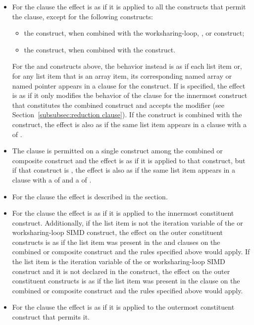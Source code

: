 \begin{itemize}
\item For the  clause the effect is as if it is applied to all the constructs that permit
the clause, except for the following constructs:
\begin{itemize}
\item the  construct, when combined with the
    worksharing-loop, , or  construct;
\item the  construct,  when combined with the  construct.
\end{itemize}
For the  and  constructs above, the behavior
instead is as if each list item or, for any list item that is an array item, its corresponding
named array or named pointer appears in a  clause for the construct.
If  is specified, the effect is as if it only modifies
the behavior of the  clause for the innermost construct that
constitutes the combined construct and accepts the modifier (see
Section~\ref{subsubsec:reduction clause}). If the construct is combined with
the  construct, the effect is also as if the same list item
appears in a  clause with a  of .

\item The  clause is permitted on a single construct
among the combined or composite construct and the effect is as if it is
applied to that construct, but if that construct is , the
effect is also as if the same list item appears in a  clause with
a  of  and a  of
.

\item For the  clause the effect is described in the  section.

\item For the  clause the effect is as if it is applied to the innermost
constituent construct.
Additionally, if the list item is not the iteration variable of the
 or worksharing-loop SIMD
construct, the effect on the outer constituent constructs is as if the list item was present
in the  and  clauses on the combined or
composite construct and the rules specified above would apply.  If the list item is the
iteration variable of the  or worksharing-loop SIMD construct and it is not declared in the construct,
the effect on the outer constituent constructs is as if the list item was present in the
 clause on the combined or composite construct and the rules specified above
would apply.

\item For the  clause the effect is as if it is applied to the
outermost constituent construct that permits it.

\end{itemize}

